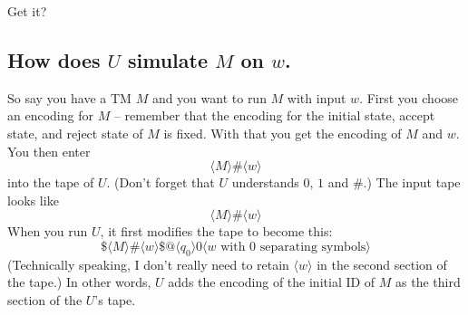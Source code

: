 Get it?

\subsection{How does $U$ simulate $M$ on $w$.}

So say you have a TM $M$ and you want to run $M$ with input $w$.
First you choose an encoding for $M$ -- remember that the
encoding for the initial state, accept state, and reject state of $M$
is fixed.
With that you get the encoding of $M$ and $w$.
You then enter
\[
\langle M \rangle
\#
\langle w \rangle
\]
into the tape of $U$.
(Don't forget that $U$ understands $0$, $1$ and $\#$.)
The input tape looks like
\[
\langle M \rangle \# \langle w \rangle 
\]
When you run $U$, it first modifies the tape to become this:
\[
\$ \langle M \rangle
\#
\langle w \rangle
\$
@
\langle q_0 \rangle
0\langle w \text{ with 0 separating symbols}\rangle
\]
(Technically speaking, I don't really need to retain
$\langle w \rangle$ in the second section of the tape.)
In other words, $U$ adds the encoding of the initial ID of $M$ as the
third section of the $U$'s tape.

